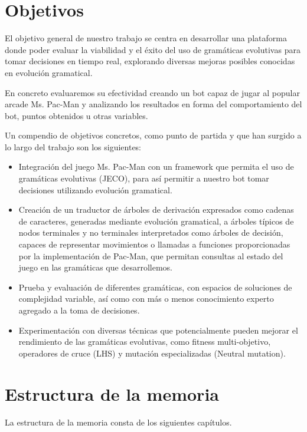 \section{Objetivos}
El objetivo general de nuestro trabajo se centra en desarrollar una plataforma donde poder evaluar la viabilidad y el éxito del uso de gramáticas evolutivas para tomar decisiones en tiempo real, explorando diversas mejoras posibles conocidas en evolución gramatical. 

En concreto evaluaremos su efectividad creando un bot capaz de jugar al popular arcade Ms. Pac-Man y analizando los resultados en forma del comportamiento del bot, puntos obtenidos u otras variables.
 
Un compendio de objetivos concretos, como punto de partida y que han surgido a lo largo del trabajo son los siguientes:
\begin{itemize}
\item Integración del juego Ms. Pac-Man con un framework que permita el uso de gramáticas evolutivas (JECO), para así permitir a nuestro bot tomar decisiones utilizando evolución gramatical.

\item Creación de un traductor de árboles de derivación expresados como cadenas de caracteres, generadas mediante evolución gramatical, a árboles típicos de nodos terminales y no terminales interpretados como árboles de decisión, capaces de representar movimientos o llamadas a funciones proporcionadas por la implementación de Pac-Man, que permitan consultas al estado del juego en las gramáticas que desarrollemos.

\item Prueba y evaluación de diferentes gramáticas, con espacios de soluciones de complejidad variable, así como con más o menos conocimiento experto agregado a la toma de decisiones.

\item Experimentación con diversas técnicas que potencialmente pueden mejorar el rendimiento de las gramáticas evolutivas, como fitness multi-objetivo, operadores de cruce (LHS) y mutación especializadas (Neutral mutation).
\end{itemize}

\section{Estructura de la memoria}
La estructura de la memoria consta de los siguientes capítulos.

